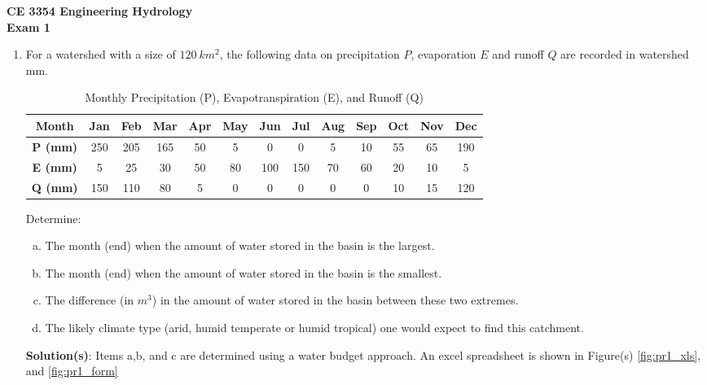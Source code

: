 \documentclass[12pt]{article}
\begin{document}
\begin{center}
{\textbf{{ CE 3354 Engineering Hydrology} \\ {Exam 1}}}
\end{center}


\begin{enumerate}

\item For a watershed with a size of $120~km^2$, the following data on precipitation $P$, evaporation
$E$ and runoff $Q$ are recorded in watershed mm.

\begin{table}[h!]
\centering
\caption{Monthly Precipitation (P), Evapotranspiration (E), and Runoff (Q)}
\begin{tabular}{|c|cccccccccccc|}
\hline
\textbf{Month} & Jan & Feb & Mar & Apr & May & Jun & Jul & Aug & Sep & Oct & Nov & Dec \\
\hline
\textbf{P (mm)} & 250 & 205 & 165 & 50 & 5 & 0 & 0 & 5 & 10 & 55 & 65 & 190 \\
\textbf{E (mm)} & 5 & 25 & 30 & 50 & 80 & 100 & 150 & 70 & 60 & 20 & 10 & 5 \\
\textbf{Q (mm)} & 150 & 110 & 80 & 5 & 0 & 0 & 0 & 0 & 0 & 10 & 15 & 120 \\
\hline
\end{tabular}
\end{table}

Determine:
    \begin{enumerate}[a)]
        \item The month (end) when the amount of water stored in the basin is the largest. 
        \item The month (end) when the amount of water stored in the basin is the smallest.
        \item The difference (in $m^3$) in the amount of water stored in the basin between these
two extremes.
        \item The likely climate type (arid, humid temperate or humid tropical) one would expect to find this
catchment.
    \end{enumerate}

\textbf{Solution(s)}:
Items a,b, and c are determined using a water budget approach.  An excel spreadsheet is shown in Figure(s) \ref{fig:pr1_xls}, and \ref{fig:pr1_form}


\end{enumerate}
\end{document}
